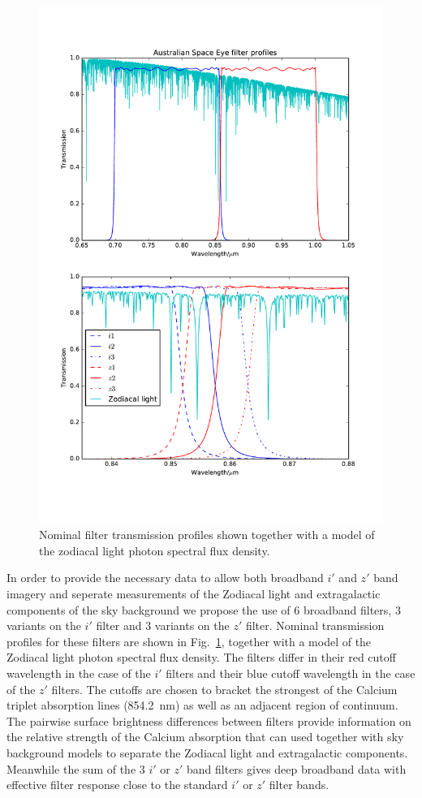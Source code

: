 \documentclass[]{iac}
\begin{document}
\begin{figure}[tp]
  \center \includegraphics[width=\columnwidth]{figures/filters.pdf}
  \caption{\label{fig:filters}Nominal filter transmission profiles shown together with a model of the zodiacal light
    photon spectral flux density.}
\end{figure}

In order to provide the necessary data to allow both broadband $i'$ and $z'$ band imagery and seperate measurements of
the Zodiacal light and extragalactic components of the sky background we propose the use of 6 broadband filters, 3
variants on the $i'$ filter and 3 variants on the $z'$ filter. Nominal transmission profiles for these filters are shown
in Fig.~\ref{fig:filters}, together with a model of the Zodiacal light photon spectral flux density. The filters differ
in their red cutoff wavelength in the case of the $i'$ filters and their blue cutoff wavelength in the case of the $z'$
filters. The cutoffs are chosen to bracket the strongest of the Calcium triplet absorption lines
(\SI{854.2}{\nano\metre}) as well as an adjacent region of continuum. The pairwise surface brightness differences
between filters provide information on the relative strength of the Calcium absorption that can used together with sky
background models to separate the Zodiacal light and extragalactic components. Meanwhile the sum of the 3 $i'$ or $z'$
band filters gives deep broadband data with effective filter response close to the standard $i'$ or $z'$ filter bands.
\end{document}
